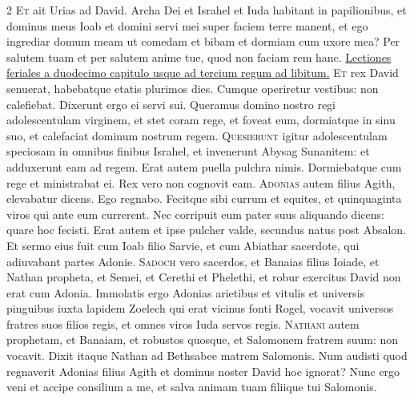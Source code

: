 \begin{multicols*}{2}
\lettrine[lines=2]{\zallmancaps \color{Red} E}{t} ait Urias ad David. Archa Dei et Israhel et Iuda habitant in papilionibus, et dominus meus Ioab et domini servi mei super faciem terre manent, et ego ingrediar domum meam ut comedam et bibam et dormiam cum uxore mea? Per salutem tuam et per salutem anime tue, quod non faciam rem hanc.
\newline \ul{Lectiones feriales a duodecimo capitulo usque ad tercium regum ad libitum.}
{\color{Red} }
\lettrine[lines=2]{\zallmancaps \color{Blue} E}{t} rex David senuerat, habebatque etatis plurimos dies. Cumque operiretur vestibus: non calefiebat. Dixerunt ergo ei servi sui. Queramus domino nostro regi adolescentulam virginem, et stet coram rege, et foveat eum, dormiatque in sinu suo, et calefaciat dominum nostrum regem.
\lettrine[lines=2]{\zallmancaps \color{Red} Q}{uesierunt} igitur adolescentulam speciosam in omnibus finibus Israhel, et invenerunt Abysag Sunanitem: et adduxerunt eam ad regem. Erat autem puella pulchra nimis. Dormiebatque cum rege et ministrabat ei. Rex vero non cognovit eam.
\lettrine[lines=2]{\zallmancaps \color{Blue} A}{donias} autem filius Agith, elevabatur dicens. Ego regnabo. Fecitque sibi currum et equites, et quinquaginta viros qui ante eum currerent. Nec corripuit eum pater suus aliquando dicens: quare hoc fecisti. Erat autem et ipse pulcher valde, secundus natus post Absalon. Et sermo eius fuit cum Ioab filio Sarvie, et cum Abiathar sacerdote, qui adiuvabant partes Adonie.
\lettrine[lines=2]{\zallmancaps \color{Red} S}{adoch} vero sacerdos, et Banaias filius Ioiade, et Nathan propheta, et Semei, et Cerethi et Phelethi, et robur exercitus David non erat cum Adonia. Immolatis ergo Adonias arietibus et vitulis et universis pinguibus iuxta lapidem Zoelech qui erat vicinus fonti Rogel, vocavit universos fratres suos filios regis, et omnes viros Iuda servos regis.
\lettrine[lines=2]{\zallmancaps \color{Blue} N}{athani} autem prophetam, et Banaiam, et robustos quosque, et Salomonem fratrem suum: non vocavit. Dixit itaque Nathan ad Bethsabee matrem Salomonis. Num audisti quod regnaverit Adonias filius Agith et dominus noster David hoc ignorat? Nunc ergo veni et accipe consilium a me, et salva animam tuam filiique tui Salomonis.

\end{multicols*}
